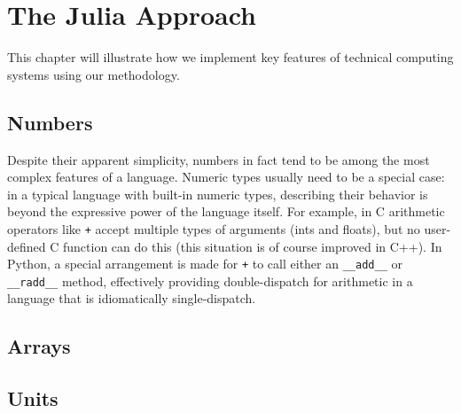 \chapter{The Julia Approach}

This chapter will illustrate how we implement key features of technical computing
systems using our methodology.


\section{Numbers}

Despite their apparent simplicity, numbers in fact tend to be among the most
complex features of a language. Numeric types usually need to be a special
case: in a typical language with built-in numeric types, describing their
behavior is beyond the expressive power of the language itself. For example,
in C arithmetic operators like \texttt{+} accept multiple types of arguments
(ints and floats), but no user-defined C function can do this (this situation
is of course improved in C++). In Python, a special arrangement is made for
\texttt{+} to call either an \texttt{\_\_add\_\_} or \texttt{\_\_radd\_\_} method, effectively
providing double-dispatch for arithmetic in a language that is idiomatically
single-dispatch.



\section{Arrays}



\section{Units}

